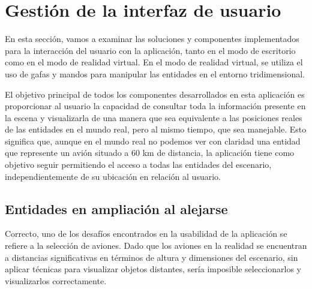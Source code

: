 \documentclass[a4paper, 11pt]{book}
\begin{document}
\clearpage
\section{Gestión de la interfaz de usuario}
\label{sec:gui}
En esta sección, vamos a examinar las soluciones y componentes implementados para la interacción del usuario con la aplicación, tanto en el modo de escritorio como en el modo de realidad virtual. En el modo de realidad virtual, se utiliza el uso de gafas y mandos para manipular las entidades en el entorno tridimensional.

El objetivo principal de todos los componentes desarrollados en esta aplicación es proporcionar al usuario la capacidad de consultar toda la información presente en la escena y visualizarla de una manera que sea equivalente a las posiciones reales de las entidades en el mundo real, pero al mismo tiempo, que sea manejable. Esto significa que, aunque en el mundo real no podemos ver con claridad una entidad que represente un avión situado a 60 km de distancia, la aplicación tiene como objetivo seguir permitiendo el acceso a todas las entidades del escenario, independientemente de su ubicación en relación al usuario.
\subsection{Entidades en ampliación al alejarse}
\label{subsec:hover-scale}
Correcto, uno de los desafíos encontrados en la usabilidad de la aplicación se refiere a la selección de aviones. Dado que los aviones en la realidad se encuentran a distancias significativas en términos de altura y dimensiones del escenario, sin aplicar técnicas para visualizar objetos distantes, sería imposible seleccionarlos y visualizarlos correctamente.
\end{document}
